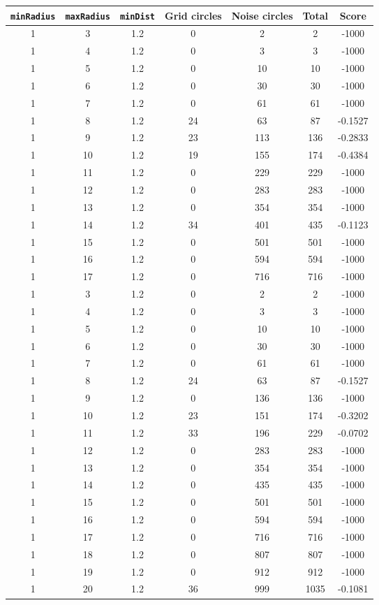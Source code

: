 \documentclass[letterpaper, 12pt]{article}
\begin{document}
\begin{longtable}{|c|c|c|c|c|c|c|}
\hline
\textbf{\texttt{minRadius}} & \textbf{\texttt{maxRadius}} & \textbf{\texttt{minDist}} & \textbf{Grid circles} & \textbf{Noise circles} & \textbf{Total} & \textbf{Score} \\
\hline
1 & 3 & 1.2 & 0 & 2 & 2 & -1000 \\
\hline
1 & 4 & 1.2 & 0 & 3 & 3 & -1000 \\
\hline
1 & 5 & 1.2 & 0 & 10 & 10 & -1000 \\
\hline
1 & 6 & 1.2 & 0 & 30 & 30 & -1000 \\
\hline
1 & 7 & 1.2 & 0 & 61 & 61 & -1000 \\
\hline
1 & 8 & 1.2 & 24 & 63 & 87 & -0.1527 \\
\hline
1 & 9 & 1.2 & 23 & 113 & 136 & -0.2833 \\
\hline
1 & 10 & 1.2 & 19 & 155 & 174 & -0.4384 \\
\hline
1 & 11 & 1.2 & 0 & 229 & 229 & -1000 \\
\hline
1 & 12 & 1.2 & 0 & 283 & 283 & -1000 \\
\hline
1 & 13 & 1.2 & 0 & 354 & 354 & -1000 \\
\hline
1 & 14 & 1.2 & 34 & 401 & 435 & -0.1123 \\
\hline
1 & 15 & 1.2 & 0 & 501 & 501 & -1000 \\
\hline
1 & 16 & 1.2 & 0 & 594 & 594 & -1000 \\
\hline
1 & 17 & 1.2 & 0 & 716 & 716 & -1000 \\
\hline
1 & 3 & 1.2 & 0 & 2 & 2 & -1000 \\
\hline
1 & 4 & 1.2 & 0 & 3 & 3 & -1000 \\
\hline
1 & 5 & 1.2 & 0 & 10 & 10 & -1000 \\
\hline
1 & 6 & 1.2 & 0 & 30 & 30 & -1000 \\
\hline
1 & 7 & 1.2 & 0 & 61 & 61 & -1000 \\
\hline
1 & 8 & 1.2 & 24 & 63 & 87 & -0.1527 \\
\hline
1 & 9 & 1.2 & 0 & 136 & 136 & -1000 \\
\hline
1 & 10 & 1.2 & 23 & 151 & 174 & -0.3202 \\
\hline
1 & 11 & 1.2 & 33 & 196 & 229 & -0.0702 \\
\hline
1 & 12 & 1.2 & 0 & 283 & 283 & -1000 \\
\hline
1 & 13 & 1.2 & 0 & 354 & 354 & -1000 \\
\hline
1 & 14 & 1.2 & 0 & 435 & 435 & -1000 \\
\hline
1 & 15 & 1.2 & 0 & 501 & 501 & -1000 \\
\hline
1 & 16 & 1.2 & 0 & 594 & 594 & -1000 \\
\hline
1 & 17 & 1.2 & 0 & 716 & 716 & -1000 \\
\hline
1 & 18 & 1.2 & 0 & 807 & 807 & -1000 \\
\hline
1 & 19 & 1.2 & 0 & 912 & 912 & -1000 \\
\hline
1 & 20 & 1.2 & 36 & 999 & 1035 & -0.1081 \\
\hline
\end{longtable}
\end{document}
